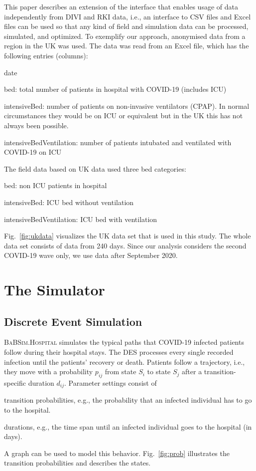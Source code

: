 \documentclass[conference]{IEEEtran}
\def\figref#1{Fig.~\ref{#1}}
\newcommand{\babsimhospital}{\textsc{BaBSim.Hospital}\xspace}
\begin{document}
This paper describes an extension of the interface that enables usage of data independently from \gls{DIVI} and \gls{RKI} data, i.e., an interface to \gls{CSV} files and Excel files can be used so that any kind of field and simulation data can be processed, simulated, and optimized.
To exemplify our approach, anonymised data from a region in the UK was used. 
The data was read from an Excel file, which has the following entries (columns):
\begin{compactitem}
\item date
\item bed: total number of patients in hospital with \gls{COVID-19} (includes \gls{ICU})
\item intensiveBed: number of patients on non-invasive ventilators (CPAP). In normal circumstances they would be on \gls{ICU} or equivalent but in the UK this has not always been possible.
\item intensiveBedVentilation: number of patients intubated and ventilated with \gls{COVID-19} on \gls{ICU}
\end{compactitem}
The field data based on UK data used three bed categories: 
\begin{compactenum}
\item bed: non ICU patients in hospital
\item intensiveBed: ICU bed without ventilation
\item intensiveBedVentilation: \gls{ICU} bed with ventilation
\end{compactenum}
\figref{fig:ukdata} visualizes the UK data set that is used in this study. The whole data set consists of data from 240 days. Since our analysis considers the second \gls{COVID-19} wave only, we use data after September 2020.

\section{The Simulator}\label{sec:sim}
\subsection{Discrete Event Simulation}
\babsimhospital simulates the typical paths that COVID-19 infected patients follow during their hospital stays. 
The \gls{DES} processes every single recorded infection until the patients' recovery or death. 
Patients follow a trajectory, i.e., they move with a probability $p_{ij}$ from state $S_i$ to state $S_j$  after a transition-specific duration $d_{ij}$.
Parameter settings consist of
\begin{compactitem}
\item transition probabilities, e.g., the probability that an infected
   individual has to go to the hospital. 
\item  durations, e.g., the time span until an infected individual goes to the
   hospital (in days). 
\end{compactitem}
A graph can be used to model this behavior.
\figref{fig:prob} illustrates the transition probabilities and describes the states.
\end{document}
